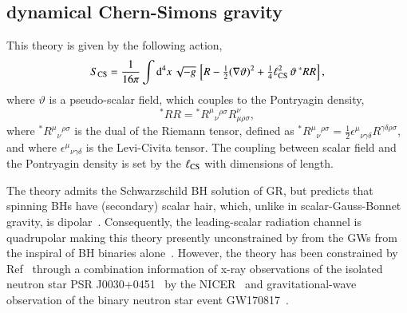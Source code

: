 \documentclass[twocolumn,prd,aps,superscriptaddress,preprintnumbers,tightenlines,showpacs,nofootinbib,amsfonts,amsmath,longbibliography]{revtex4-1}
\newcommand{\dV}{{\rm d}^{4}x \, \sqrt{-g} \,}
\begin{document}
%
%
%

\subsection{dynamical Chern-Simons gravity}

This theory is given by the following action,
%
\begin{equation} \label{eq:action_dcs}
    S_{\rm CS} = \frac{1}{16 \pi}
    \int \dV
    \left[
    R - \tfrac{1}{2}(\nabla \vartheta)^2
    + \tfrac{1}{4} \ell^{2}_{\rm CS} \, \vartheta \, {}^{*}RR
    \right],
\end{equation}
%
where $\vartheta$ is a pseudo-scalar field, which couples
to the Pontryagin density,
%
\begin{equation}
    {}^{*}RR = {}^{*}R^{\mu}{}_{\nu}{}^{\rho\sigma} R^{\nu}_{\mu\rho\sigma},
\end{equation}
%
where ${}^{*}R^{\mu}{}_{\nu}{}^{\rho\sigma}$ is the dual of the Riemann tensor,
defined as
%
${}^{*}R^{\mu}{}_{\nu}{}^{\rho\sigma} =
\tfrac{1}{2} \epsilon^{\mu}{}_{\nu\gamma\delta}
R^{\gamma\delta\rho\sigma}$,
%
and where $\epsilon^{\mu}{}_{\nu\gamma\delta}$ is the Levi-Civita tensor.
%
The coupling between scalar field and the Pontryagin density is set by the
$\ell_{\rm CS}$ with dimensions of length.

The theory admits the Schwarzschild BH solution of GR, but predicts
that spinning BHs have (secondary) scalar hair, which, unlike in
scalar-Gauss-Bonnet gravity, is dipolar~\cite{Yunes:2009hc,Konno:2009kg}.
%
Consequently, the leading-scalar radiation channel is quadrupolar making this
theory presently unconstrained by from the GWs from the inspiral of BH
binaries alone~\cite{Nair:2019iur,Perkins:2021mhb}.
%
However, the theory has been constrained by Ref~\cite{Silva:2020acr} through a
combination information of x-ray observations of the isolated neutron star PSR
J0030+0451~\cite{Lommen:2000yt,NANOGrav:2017wvv} by the
NICER~\cite{Riley:2019yda,Miller:2019cac} and gravitational-wave observation of
the binary neutron star event GW170817~\cite{TheLIGOScientific:2017qsa}.
\end{document}
